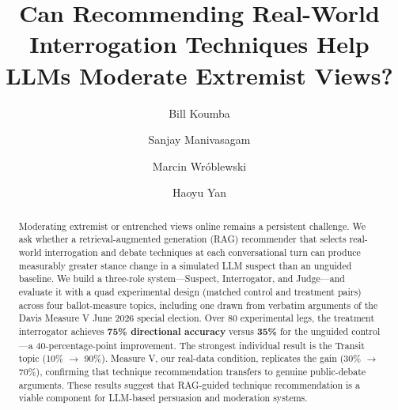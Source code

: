 \documentclass[sigconf]{acmart}
\begin{document}
\title{Can Recommending Real-World Interrogation Techniques Help LLMs Moderate Extremist Views?}

\author{Bill Koumba}

\author{Sanjay Manivasagam}

\author{Marcin Wróblewski}

\author{Haoyu Yan}

\begin{abstract}
Moderating extremist or entrenched views online remains a persistent challenge.
We ask whether a retrieval-augmented generation (RAG) recommender that selects
real-world interrogation and debate techniques at each conversational turn can
produce measurably greater stance change in a simulated LLM suspect than an
unguided baseline. We build a three-role system---Suspect, Interrogator, and
Judge---and evaluate it with a quad experimental design (matched control and
treatment pairs) across four ballot-measure topics, including one drawn from
verbatim arguments of the Davis Measure V June 2026 special election. Over 80
experimental legs, the treatment interrogator achieves \textbf{75\% directional
accuracy} versus \textbf{35\%} for the unguided control---a 40-percentage-point
improvement. The strongest individual result is the Transit topic (10\%
$\to$ 90\%). Measure V, our real-data condition, replicates the gain (30\%
$\to$ 70\%), confirming that technique recommendation transfers to genuine
public-debate arguments. These results suggest that RAG-guided technique
recommendation is a viable component for LLM-based persuasion and moderation
systems.
\end{abstract}


\maketitle

\end{document}
